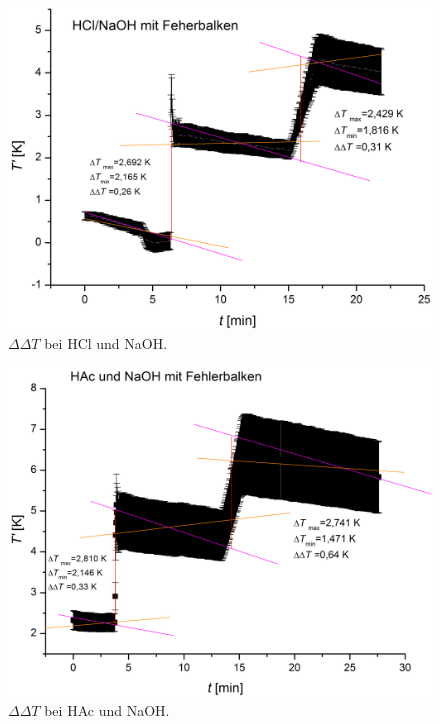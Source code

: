 \documentclass[12pt,a4paper,titlepage,headinclude,bibtotoc]{scrartcl}
\begin{document}
\begin{figure}[h] \label{HClNaOHFehlerbalken}
\centering
\includegraphics[width=13.5cm]{HClNaOHmitFehlerbalken.png}
\caption{$\Delta \Delta T$ bei HCl und NaOH.}
\end{figure} 
\FloatBarrier

\begin{figure}[h] \label{HAcNaOHFehlerbalken}
\centering
\includegraphics[width=13.5cm]{HAcNaOHmitFehlerbalken.png}
\caption{$\Delta \Delta T$ bei HAc und NaOH.}
\end{figure} 
\FloatBarrier
\end{document}
